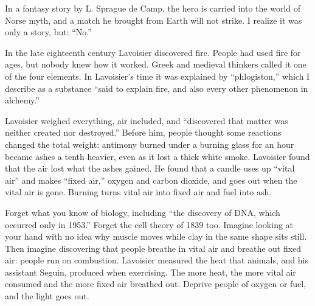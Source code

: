 
In a fantasy story by L. Sprague de Camp, the hero is carried into the world of Norse myth, and a match he brought from Earth will not strike. I realize it was only a story, but: ``No.'' 

In the late eighteenth century Lavoisier discovered fire. People had used fire for ages, but nobody knew how it worked. Greek and medieval thinkers called it one of the four elements. In Lavoisier's time it was explained by ``phlogiston,'' which I describe as a substance ``said to explain fire, and also every other phenomenon in alchemy.'' 

Lavoisier weighed everything, air included, and ``discovered that matter was neither created nor destroyed.'' Before him, people thought some reactions changed the total weight: antimony burned under a burning glass for an hour became ashes a tenth heavier, even as it lost a thick white smoke. Lavoisier found that the air lost what the ashes gained.  He found that a candle uses up ``vital air'' and makes ``fixed air,'' oxygen and carbon dioxide, and goes out when the vital air is gone. Burning turns vital air into fixed air and fuel into ash.

Forget what you know of biology, including ``the discovery of DNA, which occurred only in 1953.''  Forget the cell theory of 1839 too. Imagine looking at your hand with no idea why muscle moves while clay in the same shape sits still. Then imagine discovering that people breathe in vital air and breathe out fixed air: people run on combustion. Lavoisier measured the heat that animals, and his assistant Seguin, produced when exercising. The more heat, the more vital air consumed and the more fixed air breathed out. Deprive people of oxygen or fuel, and the light goes out. 

